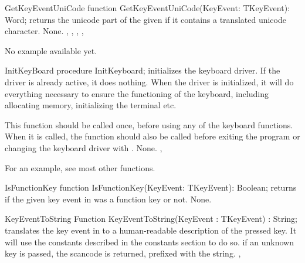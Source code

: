 
\begin{function}{GetKeyEventUniCode}
\Declaration
function GetKeyEventUniCode(KeyEvent: TKeyEvent): Word;
\Description
{} returns the unicode part of the 
given  if it contains a translated unicode 
character.
\Errors
None.
\SeeAlso
{},
, 
,
,
\end{function}

No example available yet.

\begin{procedure}{InitKeyBoard}
\Declaration
procedure InitKeyboard;
\Description
{} initializes the keyboard driver. 
If the driver is already active, it does nothing. When the driver is
initialized, it will do everything necessary to ensure the functioning of
the keyboard, including allocating memory, initializing the terminal etc.

This function should be called once, before using any of the
keyboard functions. When it is called, the  function
should also be called before exiting the program or changing the keyboard
driver with .
\Errors
None.
\SeeAlso
{}, 
\end{procedure}

For an example, see most other functions.

\begin{function}{IsFunctionKey}
\Declaration
function IsFunctionKey(KeyEvent: TKeyEvent): Boolean;
\Description
{} returns  if the given key event
in  was a function key or not.
\Errors
None.
\SeeAlso
{}
\end{function}


\begin{function}{KeyEventToString}
\Declaration
Function KeyEventToString(KeyEvent : TKeyEvent) : String;
\Description
{} translates the key event in  to a
human-readable description of the pressed key. It will use the constants
described in the constants section to do so.
\Errors
if an unknown key is passed, the scancode is returned, prefixed with the 
 string.
\SeeAlso
{}, 
\end{function}

